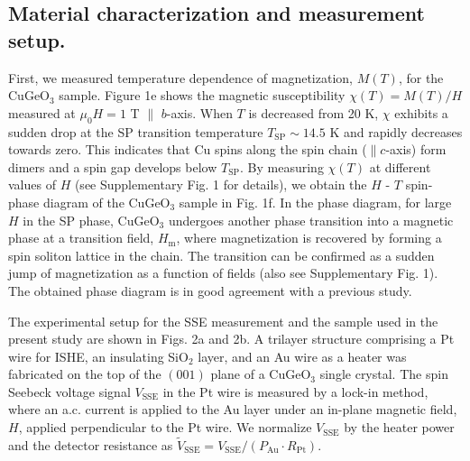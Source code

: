 \documentclass{nature}
\begin{document}
\subsection{Material characterization and measurement setup.}
First, we measured temperature dependence of magnetization, $M(T)$, for the CuGeO$_3$ sample.
Figure 1e shows the magnetic susceptibility $\chi(T) = M(T)/H$ measured at $\mu_0H = 1$ T $\parallel$ $b$-axis. 
When $T$ is decreased from 20 K, $\chi$ exhibits a sudden drop at the SP transition temperature $T_{\mathrm{SP}} \sim 14.5 $ K and rapidly decreases towards zero. 
 This indicates that Cu spins along the spin chain ($\parallel c$-axis) form dimers and a spin gap develops below $T_{\mathrm{SP}}$.
By measuring $\chi(T)$ at different values of $H$ (see Supplementary Fig. 1 for details), we obtain the $H$ - $T$ spin-phase diagram of the CuGeO$_3$ sample in Fig. 1f.
In the phase diagram, for large $H$ in the SP phase, CuGeO$_3$ 
undergoes another phase transition into a magnetic phase at a transition field, $H_{\mathrm{m}}$, where magnetization is recovered by forming a spin soliton lattice in the chain\cite{Ronnow:2000dt}.
The transition can be confirmed as a sudden jump of magnetization as a function of fields\cite{Hase:1994ez} (also see Supplementary Fig. 1).
The obtained phase diagram is in good agreement with a previous study\cite{Uchinokura:1995cu}.

\par 

The experimental setup for the SSE measurement and the sample used in the present study are shown in Figs. 2a and 2b.
A trilayer structure comprising a Pt wire for ISHE, an insulating SiO$_2$ layer, and an Au wire as a heater was fabricated on the top of the $(001)$ plane of a CuGeO$_3$ single crystal.
  The spin Seebeck voltage signal $V_{\mathrm{SSE}}$ in the Pt wire is measured by a lock-in method, where an a.c. current is applied to the Au layer under an in-plane magnetic field, $H$, applied perpendicular to the Pt wire.
  We normalize $V_{\mathrm{SSE}}$ by the heater power and the detector resistance as $\tilde{V}_{\mathrm{SSE}}=V_{\mathrm{SSE}}/(P_{\mathrm{Au}}\cdot R_{\mathrm{Pt}})$.


\par 
\end{document}
